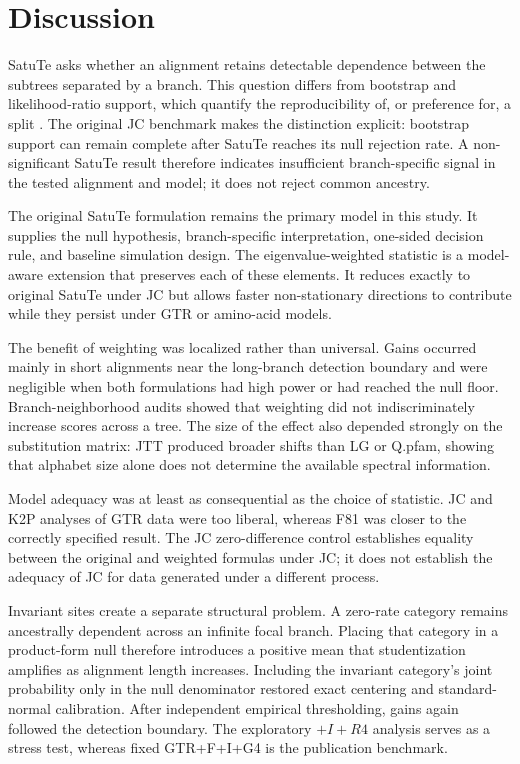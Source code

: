 \section*{Discussion}

SatuTe asks whether an alignment retains detectable dependence between the subtrees separated by a branch. This question differs from bootstrap and likelihood-ratio support, which quantify the reproducibility of, or preference for, a split \cite{felsenstein1985confidence,hoang2017,lemoine2018}. The original JC benchmark makes the distinction explicit: bootstrap support can remain complete after SatuTe reaches its null rejection rate. A non-significant SatuTe result therefore indicates insufficient branch-specific signal in the tested alignment and model; it does not reject common ancestry.

The original SatuTe formulation remains the primary model in this study. It supplies the null hypothesis, branch-specific interpretation, one-sided decision rule, and baseline simulation design. The eigenvalue-weighted statistic is a model-aware extension that preserves each of these elements. It reduces exactly to original SatuTe under JC but allows faster non-stationary directions to contribute while they persist under GTR or amino-acid models.

The benefit of weighting was localized rather than universal. Gains occurred mainly in short alignments near the long-branch detection boundary and were negligible when both formulations had high power or had reached the null floor. Branch-neighborhood audits showed that weighting did not indiscriminately increase scores across a tree. The size of the effect also depended strongly on the substitution matrix: JTT produced broader shifts than LG or Q.pfam, showing that alphabet size alone does not determine the available spectral information.

Model adequacy was at least as consequential as the choice of statistic. JC and K2P analyses of GTR data were too liberal, whereas F81 was closer to the correctly specified result. The JC zero-difference control establishes equality between the original and weighted formulas under JC; it does not establish the adequacy of JC for data generated under a different process.

Invariant sites create a separate structural problem. A zero-rate category remains ancestrally dependent across an infinite focal branch. Placing that category in a product-form null therefore introduces a positive mean that studentization amplifies as alignment length increases. Including the invariant category's joint probability only in the null denominator restored exact centering and standard-normal calibration. After independent empirical thresholding, gains again followed the detection boundary. The exploratory \(+I+R4\) analysis serves as a stress test, whereas fixed GTR+F+I+G4 is the publication benchmark.

